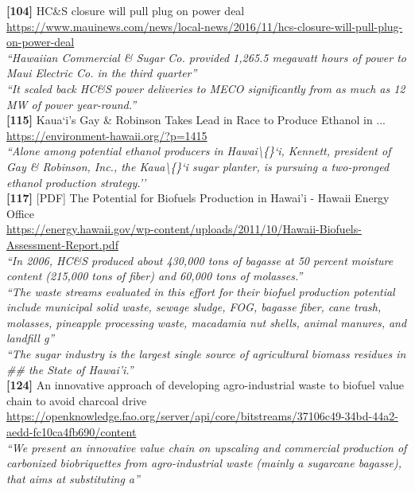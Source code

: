 \textbf{[104]} HC\&S closure will pull plug on power deal\\[0.15em]
\url{https://www.mauinews.com/news/local-news/2016/11/hcs-closure-will-pull-plug-on-power-deal}\\[0.2em]
\emph{``Hawaiian Commercial \& Sugar Co. provided 1,265.5 megawatt hours of power to Maui Electric Co. in the third quarter''}\\[0.45em]
\emph{``It scaled back HC\&S power deliveries to MECO significantly from as much as 12 MW of power year-round.''}\\[0.45em]

\textbf{[115]} Kaua`i's Gay \& Robinson Takes Lead in Race to Produce Ethanol in ...\\[0.15em]
\url{https://environment-hawaii.org/?p=1415}\\[0.2em]
\emph{``Alone among potential ethanol producers in Hawai\textbackslash\{\}`i, Kennett, president of Gay \& Robinson, Inc., the Kaua\textbackslash\{\}`i sugar planter, is pursuing a two-pronged ethanol production strategy.''}\\[0.45em]

\textbf{[117]} [PDF] The Potential for Biofuels Production in Hawai'i - Hawaii Energy Office\\[0.15em]
\url{https://energy.hawaii.gov/wp-content/uploads/2011/10/Hawaii-Biofuels-Assessment-Report.pdf}\\[0.2em]
\emph{``In 2006, HC\&S produced about 430,000 tons of bagasse at 50 percent moisture content (215,000 tons of fiber) and 60,000 tons of molasses.''}\\[0.45em]
\emph{``The waste streams evaluated in this effort for their biofuel production potential include municipal solid waste, sewage sludge, FOG, bagasse fiber, cane trash, molasses, pineapple processing waste, macadamia nut shells, animal manures, and landfill g''}\\[0.45em]
\emph{``The sugar industry is the largest single source of agricultural biomass residues in \#\# the State of Hawai’i.''}\\[0.45em]

\textbf{[124]} An innovative approach of developing agro-industrial waste to biofuel value chain to avoid charcoal drive\\[0.15em]
\url{https://openknowledge.fao.org/server/api/core/bitstreams/37106c49-34bd-44a2-aedd-fc10ca4fb690/content}\\[0.2em]
\emph{``We present an innovative value chain on upscaling and commercial production of carbonized biobriquettes from agro-industrial waste (mainly a sugarcane bagasse), that aims at substituting a''}\\[0.45em]

